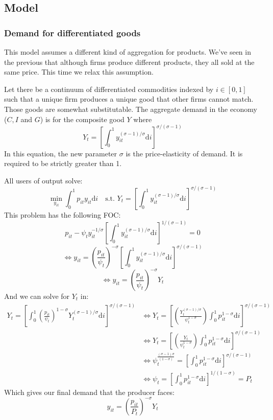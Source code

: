 \documentclass[12pt]{report}
\def\D{\mathrm{d}}
\def\D{\mathrm{d}}
\begin{document}
\subsection{Model}

\subsubsection{Demand for differentiated goods}

This model assumes a different kind of aggregation for products. We've seen in the previous that although firms produce different products, they all sold at the same price. This time we relax this assumption.

Let there be a continuum of differentiated commodities indexed by $i\in[0,1]$ such that a unique firm produces a unique good that other firms cannot match. Those goods are somewhat substitutable. The aggregate demand in the economy ($C, I$ and $G$) is for the composite good $Y$ where $$Y_t = \left[\int_0^1 y_{it}^{(\sigma -1)/\sigma}\D i\right]^{\sigma/(\sigma -1)}$$ In this equation, the new parameter $\sigma$ is the price-elasticity of demand. It is required to be strictly greater than 1.

All users of output solve: $$\min_{y_{it}}\int_0^1 p_{it}y_{it}\D i \text{ }\text{ s.t. } Y_t = \left[\int_0^1 y_{it}^{(\sigma -1)/\sigma}\D i\right]^{\sigma/(\sigma -1)} $$ This problem has the following FOC: $$p_{it} - \psi_ty_{it}^{-1/\sigma}\left[\int_0^1 y_{it}^{(\sigma -1)/\sigma}\D i\right]^{1/(\sigma -1)} = 0$$ $$\Leftrightarrow y_{it} = \left(\frac{p_{it}}{\psi_{t}}\right)^{-\sigma} \left[\int_0^1 y_{it}^{(\sigma -1)/\sigma}\D i\right]^{\sigma/(\sigma -1)} $$ $$ \Leftrightarrow y_{it} = \left(\frac{p_{it}}{\psi_{t}}\right)^{-\sigma} Y_t$$ And we can solve for $Y_t$ in:\begin{align*}
Y_t = \left[\int_0^1 \left(\frac{p_{it}}{\psi_{t}}\right)^{1-\sigma} Y_t^{(\sigma -1)/\sigma}\D i\right]^{\sigma/(\sigma -1)} & \Leftrightarrow Y_t = \left[\left(\frac{Y_t^{(\sigma -1)/\sigma}}{\psi_{t}^{1-\sigma}}\right) \int_0^1 p_{it}^{1-\sigma} \D i\right]^{\sigma/(\sigma - 1)} \\ & \Leftrightarrow Y_t = \left[\left(\frac{Y_t}{\psi_{t}^{1-\sigma}}\right) \int_0^1 p_{it}^{1-\sigma} \D i\right]^{\sigma/(\sigma - 1)} \\
& \Leftrightarrow \psi_{t}^{\frac{(\sigma - 1)\sigma}{(1-\sigma)}} = \left[\int_0^1 p_{it}^{1-\sigma} \D i\right]^{\sigma/(\sigma - 1)} \\
& \Leftrightarrow \psi_{t} = \left[\int_0^1 p_{it}^{1-\sigma} \D i\right]^{1/(1 - \sigma)} = P_t
\end{align*} Which gives our final demand that the producer faces: $$y_{it} = \left(\frac{p_{it}}{P_t}\right)^{-\sigma}Y_t $$
\end{document}
